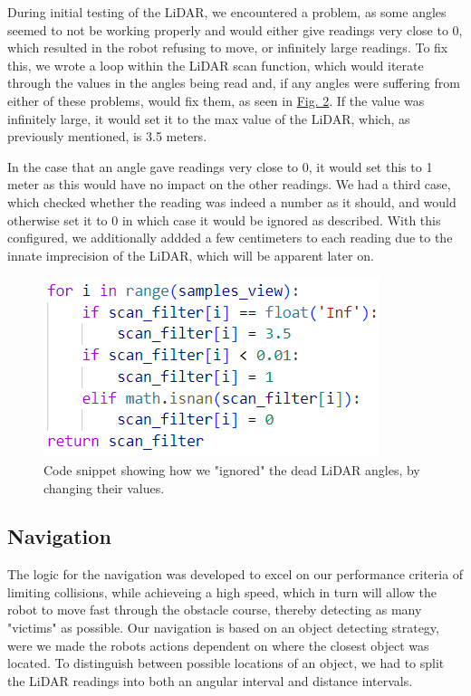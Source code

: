 \documentclass[conference]{IEEEtran}
\begin{document}
During initial testing of the LiDAR, we encountered a problem, as some angles seemed to not be working properly and would either give readings very close to 0, which resulted in the robot refusing to move, or infinitely large readings.
To fix this, we wrote a loop within the LiDAR scan function, which would iterate through the values in the angles being read and, if any angles were suffering from either of these problems, would fix them, as seen in \href{sec:lidar}{Fig. 2}.
If the value was infinitely large, it would set it to the max value of the LiDAR, which, as previously mentioned, is 3.5 meters.

In the case that an angle gave readings very close to 0, it would set this to 1 meter as this would have no impact on the other readings.
We had a third case, which checked whether the reading was indeed a number as it should, and would otherwise set it to 0 in which case it would be ignored as described.
With this configured, we additionally addded a few centimeters to each reading due to the innate imprecision of the LiDAR, which will be apparent later on.
\begin{figure}[htbp]
    \centerline{\includegraphics[width=0.8\columnwidth\hspace{-0.5cm}]{Pictures/LiDARhvid.png}}
    \caption{Code snippet showing how we "ignored" the dead LiDAR angles, by changing their values.}
    \label{sec:lidar}
    \end{figure}

\subsection{Navigation}
The logic for the navigation was developed to excel on our performance criteria of limiting collisions, while achieveing a high speed, which in turn will allow the robot to move fast through the obstacle course, thereby detecting as many "victims" as possible.
Our navigation is based on an object detecting strategy, were we made the robots actions dependent on where the closest object was located.
To distinguish between possible locations of an object, we had to split the LiDAR readings into both an angular interval and distance intervals.
\end{document}
